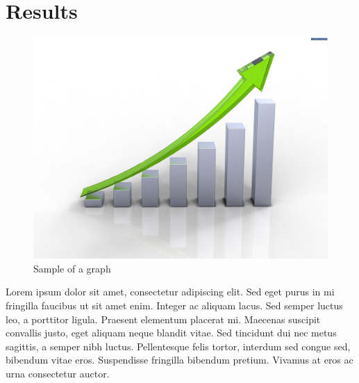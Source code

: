 
\section{Results}
\label{sec:results}

\begin{figure}

\includegraphics[keepaspectratio, width=0.35\textheight]
{./img/graph.jpg}
\caption{Sample of a graph}
\label{fig:graph}
\end{figure}

Lorem ipsum dolor sit amet, consectetur adipiscing elit. Sed eget purus in mi fringilla faucibus ut sit amet enim. Integer ac aliquam lacus. Sed semper luctus leo, a porttitor ligula. Praesent elementum placerat mi. Maecenas suscipit convallis justo, eget aliquam neque blandit vitae. Sed tincidunt dui nec metus sagittis, a semper nibh luctus. Pellentesque felis tortor, interdum sed congue sed, bibendum vitae eros. Suspendisse fringilla bibendum pretium. Vivamus at eros ac urna consectetur auctor.
